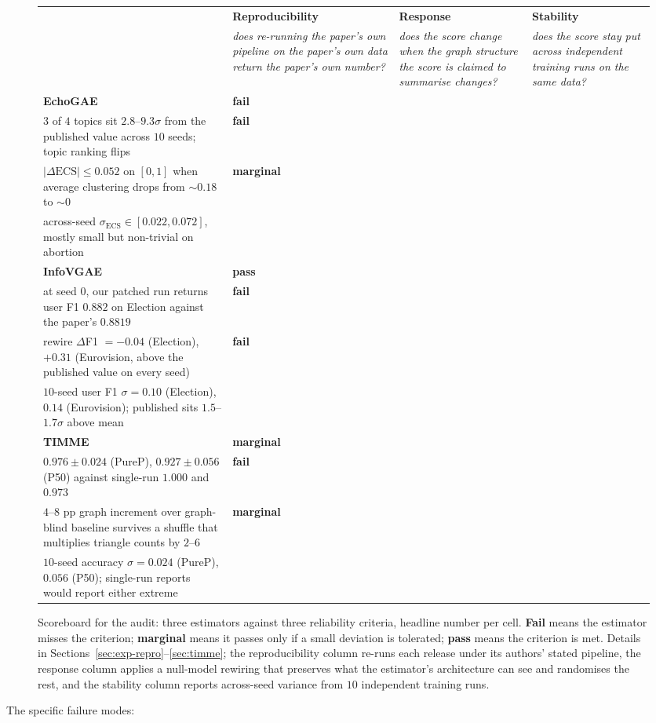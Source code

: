 \documentclass[letterpaper]{article} %
\newcommand{\vfail}[1]{\cellcolor{cellfail}\textbf{fail} \\ #1}
\newcommand{\vwarn}[1]{\cellcolor{cellwarn}\textbf{marginal} \\ #1}
\newcommand{\vpass}[1]{\cellcolor{cellpass}\textbf{pass} \\ #1}
\begin{document}
\begin{figure}[t]
\centering
\small
\setlength{\tabcolsep}{6pt}
\renewcommand{\arraystretch}{1.35}
\begin{tabular}{lp{}p{}p{}}
\toprule
 & \textbf{Reproducibility} & \textbf{Response} & \textbf{Stability} \\
 & \emph{does re-running the paper's own pipeline on the paper's own data return the paper's own number?} & \emph{does the score change when the graph structure the score is claimed to summarise changes?} & \emph{does the score stay put across independent training runs on the same data?} \\
\midrule
\textbf{EchoGAE} \citep{Alatawi23EchoGAE}
& \vfail{$3$ of $4$ topics sit $2.8$--$9.3\sigma$ from the published value across $10$ seeds; topic ranking flips}
& \vfail{$|\Delta\mathrm{ECS}| \le 0.052$ on $[0, 1]$ when average clustering drops from $\sim\!0.18$ to $\sim\!0$}
& \vwarn{across-seed $\sigma_{\mathrm{ECS}} \in [0.022, 0.072]$, mostly small but non-trivial on abortion} \\
\textbf{InfoVGAE} \citep{Li22InfoVGAE}
& \vpass{at seed $0$, our patched run returns user F1 $0.882$ on Election against the paper's $0.8819$}
& \vfail{rewire $\Delta$F1 $= -0.04$ (Election), $+0.31$ (Eurovision, above the published value on every seed)}
& \vfail{$10$-seed user F1 $\sigma = 0.10$ (Election), $0.14$ (Eurovision); published sits $1.5$--$1.7\sigma$ above mean} \\
\textbf{TIMME} \citep{XiaoTIMME2020}
& \vwarn{$0.976 \pm 0.024$ (PureP), $0.927 \pm 0.056$ (P50) against single-run $1.000$ and $0.973$}
& \vfail{$4$--$8$ pp graph increment over graph-blind baseline survives a shuffle that multiplies triangle counts by $2$--$6$}
& \vwarn{$10$-seed accuracy $\sigma = 0.024$ (PureP), $0.056$ (P50); single-run reports would report either extreme} \\
\bottomrule
\end{tabular}
\caption{Scoreboard for the audit: three estimators against three
reliability criteria, headline number per cell. \textbf{Fail} means
the estimator misses the criterion; \textbf{marginal} means it
passes only if a small deviation is tolerated; \textbf{pass}
means the criterion is met. Details in
Sections~\ref{sec:exp-repro}--\ref{sec:timme}; the reproducibility
column re-runs each release under its authors' stated pipeline,
the response column applies a null-model rewiring that preserves
what the estimator's architecture can see and randomises the
rest, and the stability column reports across-seed variance from
$10$ independent training runs.}\label{fig:scoreboard}
\end{figure} The specific failure
modes:
\end{document}
